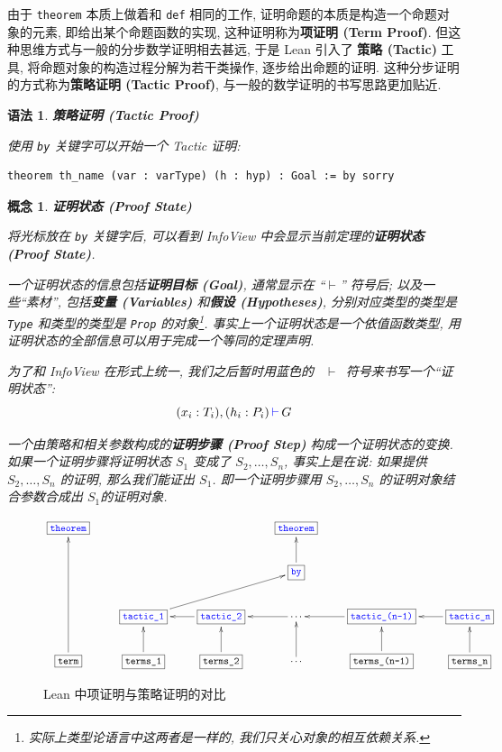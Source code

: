\documentclass[UTF8]{ctexart}
\DeclareMathOperator{\0}{\mathbf{0}}                    %
\newcommand{\<}{\langle}
\renewcommand{\>}{\rangle}                              %
\newenvironment{dfn_box}{
    \begin{tcolorbox}[enhanced, colback=dfn_green2, boxrule=0pt, frame hidden,
        borderline west={0.7mm}{0.1mm}{dfn_green1},breakable]
    }
    {\end{tcolorbox}}
\newenvironment{thm_box}{
    \begin{tcolorbox}[enhanced, colback=thm_blue2, boxrule=0pt, frame hidden,
        borderline west={0.7mm}{0.1mm}{thm_blue1},breakable]
    }
    {\end{tcolorbox}}
\theoremstyle{MyStyle} %
\newtheorem{concept}[definition]{概念}
\newenvironment{cpt}[1]
{
    \begin{dfn_box}
        \begin{concept}
            \textbf{#1}
            \newline
}
{
        \end{concept}
    \end{dfn_box}
}
\newtheorem{syntax}[definition]{语法}
\newenvironment{syn}[1]
{
    \begin{thm_box}
        \begin{syntax}
            \textbf{#1}
            \newline
}
{
        \end{syntax}
    \end{thm_box}
}
\newcommand*{\lean}[1]{\texttt{\color{blue}#1}}
\newcommand{\Goal}{\texttt{\,\color{leanblue}\ensuremath{\vdash}\,}}
\begin{document}
        由于 \lean{theorem} 本质上做着和 \lean{def} 相同的工作, 证明命题的本质是构造一个命题对象的元素, 即给出某个命题函数的实现, 这种证明称为\textbf{项证明 (Term Proof)}. 但这种思维方式与一般的分步数学证明相去甚远, 于是 Lean 引入了 \textbf{策略 (Tactic)} 工具, 将命题对象的构造过程分解为若干类操作, 逐步给出命题的证明. 这种分步证明的方式称为\textbf{策略证明 (Tactic Proof)}, 与一般的数学证明的书写思路更加贴近. 
        
        \begin{syn}
            {策略证明 (Tactic Proof)}
            使用 \lean{by} 关键字可以开始一个 Tactic 证明: 
            \begin{lstlisting}[style=lean]
    theorem th_name (var : varType) (h : hyp) : Goal := by sorry
            \end{lstlisting}
        \end{syn}

        \begin{cpt}
            {证明状态 (Proof State)}
            将光标放在 \lean{by} 关键字后, 可以看到 InfoView 中会显示当前定理的\textbf{证明状态 (Proof State)}. 
            
            一个证明状态的信息包括\textbf{证明目标 (Goal)}, 通常显示在 ``\lean{$\vdash$}'' 符号后; 以及一些``素材'', 包括\textbf{变量 (Variables)} 和\textbf{假设 (Hypotheses)}, 分别对应类型的类型是 \lean{Type} 和类型的类型是 \lean{Prop} 的对象\footnote{实际上类型论语言中这两者是一样的, 我们只关心对象的相互依赖关系. }. 事实上一个证明状态是一个依值函数类型, 用证明状态的全部信息可以用于完成一个等同的定理声明. 

            为了和 InfoView 在形式上统一, 我们之后暂时用蓝色的 \Goal 符号来书写一个``证明状态'': 
            \[(x_i:T_i), (h_i:P_i)\Goal G\]
            
            一个由策略和相关参数构成的\textbf{证明步骤 (Proof Step)} 构成一个证明状态的变换. 如果一个证明步骤将证明状态 $S_1$ 变成了 $S_2,\dots,S_n$, 事实上是在说: 如果提供 $S_2,\dots,S_n$ 的证明, 那么我们能证出 $S_1$. 即一个证明步骤用 $S_2,\dots,S_n$ 的证明对象结合参数合成出 $S_1$的证明对象. 
        \end{cpt}

        \begin{figure}[htbp]
            \centering
            \[
            \xymatrix{
                \boxed{\lean{theorem}} & & & \boxed{\lean{theorem}} \\
                & & & \boxed{\lean{by}}\ar[u] \\
                & \boxed{\lean{tactic\_1}}\ar[urr] & \boxed{\lean{tactic\_2}}\ar[l] & \cdots\ar[l] & \boxed{\lean{tactic\_{(n-1)}}}\ar[l] & \boxed{\lean{tactic\_n}}\ar[l] \\
                \boxed{\texttt{term}}\ar[uuu] & \boxed{\texttt{terms\_1}}\ar[u] & \boxed{\texttt{terms\_2}}\ar[u] & \cdots\ar[u] & \boxed{\texttt{terms\_{(n-1)}}}\ar[u] & \boxed{\texttt{terms\_n}}\ar[u]
            }
            \]\label{fig:example2}
            \caption{Lean 中项证明与策略证明的对比}
        \end{figure}
\end{document}

